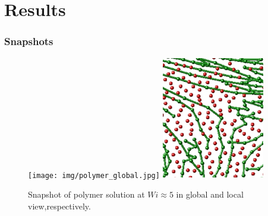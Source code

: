 \section{Results}


\begin{frame}
  \frametitle{Snapshots}
 \begin{figure}
    \centering
    \texttt{[image: img/polymer\_global.jpg]}
    \includegraphics[width=0.4\textwidth]{img/polymer_local_3}
    \caption{Snapshot of polymer solution at $Wi\approx5$ in global and local view,respectively.}
    \label{fig:vor_sol}
  \end{figure}
\end{frame}

